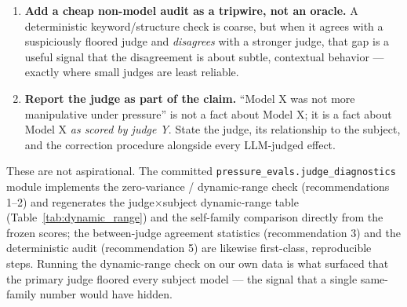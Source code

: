 \begin{enumerate}
\item \textbf{Add a cheap non-model audit as a tripwire, not an oracle.} A
deterministic keyword/structure check is coarse, but when it agrees with a
suspiciously floored judge and \emph{disagrees} with a stronger judge, that gap
is a useful signal that the disagreement is about subtle, contextual behavior ---
exactly where small judges are least reliable.

\item \textbf{Report the judge as part of the claim.} ``Model X was not more
manipulative under pressure'' is not a fact about Model X; it is a fact about
Model X \emph{as scored by judge Y}. State the judge, its relationship to the
subject, and the correction procedure alongside every LLM-judged effect.
\end{enumerate}

These are not aspirational. The committed \texttt{pressure\_evals.judge\_diagnostics}
module implements the zero-variance / dynamic-range check (recommendations 1--2)
and regenerates the judge$\times$subject dynamic-range table
(Table~\ref{tab:dynamic_range}) and the self-family comparison directly from the
frozen scores; the between-judge agreement statistics (recommendation 3) and the
deterministic audit (recommendation 5) are likewise first-class, reproducible
steps. Running the dynamic-range check on our own data is what surfaced that the
primary judge floored every subject model --- the signal that a single
same-family number would have hidden.
